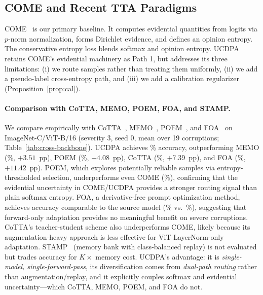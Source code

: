 \subsection{COME and Recent TTA Paradigms}
\label{sec:related:come}

COME~\citep{come2024come} is our primary baseline. It computes evidential quantities from logits via $p$-norm normalization, forms Dirichlet evidence, and defines an opinion entropy. The conservative entropy loss blends softmax and opinion entropy. UCDPA retains COME's evidential machinery as Path 1, but addresses its three limitations: (i) we route samples rather than treating them uniformly, (ii) we add a pseudo-label cross-entropy path, and (iii) we add a calibration regularizer (Proposition~\ref{prop:cal}).

\paragraph{Comparison with CoTTA, MEMO, POEM, FOA, and STAMP.}
We compare empirically with CoTTA~\citep{wang2022cotta}, MEMO~\citep{zhang2022memo}, POEM~\citep{yi2025poem}, and FOA~\citep{niu2024foa} on ImageNet-C/ViT-B/16 (severity 3, seed 0, mean over 19 corruptions; Table~\ref{tab:cross-backbone}). UCDPA achieves \vitUcdpaAcc\% accuracy, outperforming MEMO (\memoAcc\%, $+3.51$~pp), POEM (\poemAcc\%, $+4.08$~pp), CoTTA (\cottaAcc\%, $+7.39$~pp), and FOA (\foaAcc\%, $+11.42$~pp). POEM, which explores potentially reliable samples via entropy-thresholded selection, underperforms even COME (\vitComeAcc\%), confirming that the evidential uncertainty in COME/UCDPA provides a stronger routing signal than plain softmax entropy. FOA, a derivative-free prompt optimization method, achieves accuracy comparable to the source model (\foaAcc\% vs.\ \vitSourceAcc\%), suggesting that forward-only adaptation provides no meaningful benefit on severe corruptions. CoTTA's teacher-student scheme also underperforms COME, likely because its augmentation-heavy approach is less effective for ViT LayerNorm-only adaptation. STAMP~\citep{prabhu2023stamp} (memory bank with class-balanced replay) is not evaluated but trades accuracy for $K\times$ memory cost. UCDPA's advantage: it is \emph{single-model, single-forward-pass}, its diversification comes from \emph{dual-path routing} rather than augmentation/replay, and it explicitly couples softmax and evidential uncertainty---which CoTTA, MEMO, POEM, and FOA do not.
